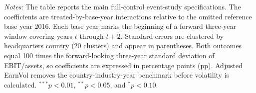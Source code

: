 \begin{table}[htbp]
   \par \raggedright
   \textit{Notes:} The table reports the main full-control event-study specifications. The coefficients are treated-by-base-year interactions relative to the omitted reference base year 2016. Each base year marks the beginning of a forward three-year window covering years $t$ through $t+2$. Standard errors are clustered by headquarters country (20 clusters) and appear in parentheses. Both outcomes equal 100 times the forward-looking three-year standard deviation of EBIT/assets, so coefficients are expressed in percentage points (pp). Adjusted EarnVol removes the country-industry-year benchmark before volatility is calculated. $^{***}p<0.01$, $^{**}p<0.05$, and $^{*}p<0.10$.
\end{table}
